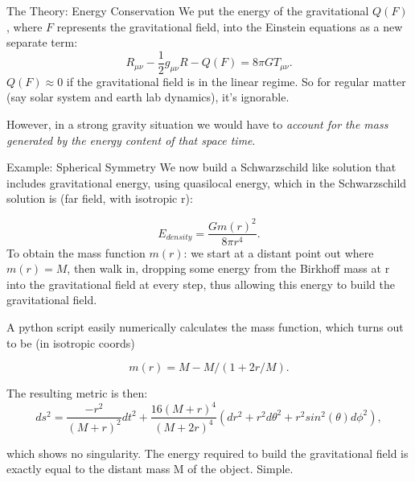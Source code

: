 \documentclass[final]{beamer}
\newlength{\colwidth}
\begin{document}
\begin{frame}[t]
\begin{columns}[t]
\begin{column}{\colwidth}
  \begin{block}{The Theory: Energy Conservation}
We put the energy of the gravitational $Q(F)$ , where $F$ represents the gravitational field, into the Einstein equations as a new separate term: 
  \begin{equation}
R_{\mu\nu}-\dfrac{1}{2}g_{\mu\nu}R - Q(F) = 8\pi G T_{\mu \nu}.
\label{newEquation}
\end{equation}
	$Q(F) \approx 0$ if the gravitational field is in the linear regime. So for regular matter (say solar system and earth lab dynamics), it's ignorable. 
	
	However, in a strong gravity situation we would have to \textit{account for the mass generated by the energy content of that space time}.
\end{block}
  
  \begin{block}{Example: Spherical Symmetry }
 We now build a Schwarzschild like solution that includes gravitational energy, using quasilocal energy, which in the Schwarzschild solution is (far field, with isotropic r)\cite{lyndenbell1985}: 

\begin{equation} \label{energyDensityEqn}
	E_{density} = \frac{Gm(r)^2}{8 \pi r^4}.
\end{equation}
To obtain the mass function $m(r)$: we start at a distant point out where $m(r) = M$, then walk in, dropping some energy from the Birkhoff mass at r into the gravitational field at every step, thus allowing this energy to build the gravitational field.
	
A python script\cite{RzeroJupyterGravitationalEnergyipynb} easily numerically calculates the mass function, which turns out to be (in isotropic coords)

\begin{equation}
	m(r) = M - M/(1 + 2r/M).
\end{equation}

The resulting metric is then:
		\begin{equation} \label{lineElement}
			ds^2 = \frac{-r^2}{(M+r)^2}dt^2 + \frac{16(M+r)^4}{(M+2r)^4}(dr^2 + r^2d\theta^2 + r^2 sin^2(\theta)d\phi^2),
		\end{equation}

which shows no singularity. The energy required to build the gravitational field is exactly equal to the distant mass M of the object. Simple.
\end{block}


\end{column}
\end{columns}
\end{frame}
\end{document}
